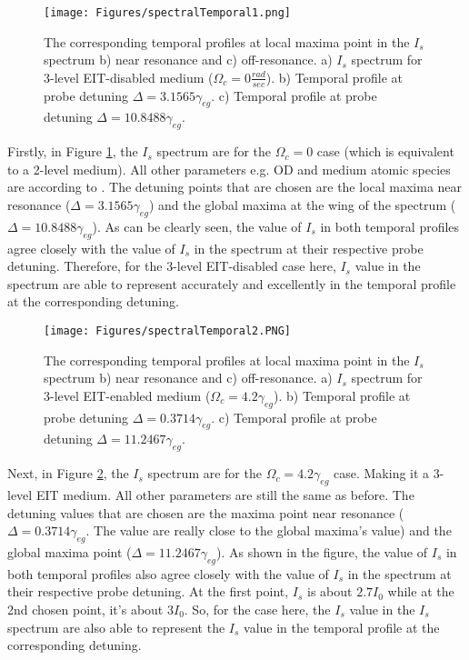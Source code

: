 \begin{figure}[h!]
    \centering
    \texttt{[image: Figures/spectralTemporal1.png]}
    \caption{The corresponding temporal profiles at local maxima point in the $I_{s}$ spectrum b) near resonance and c) off-resonance. a) $I_{s}$ spectrum for 3-level EIT-disabled medium ($\Omega_{c} = 0 \frac{rad}{sec}$). b)  Temporal profile at probe detuning $\Delta = 3.1565\gamma_{eg}$. c) Temporal profile at probe detuning $\Delta = 10.8488\gamma_{eg}$.}
    \label{fig: corresponding temporal profile 1}
\end{figure}

Firstly, in Figure \ref{fig: corresponding temporal profile 1}, the $I_{s}$ spectrum are for the $\Omega_{c} = 0$ case (which is equivalent to a 2-level medium). All other parameters e.g. OD and medium atomic species are according to \cite{jeong2010slow}. The detuning points that are chosen are the local maxima near resonance ($\Delta = 3.1565\gamma_{eg}$) and the global maxima at the wing of the spectrum ($\Delta = 10.8488\gamma_{eg}$). As can be clearly seen, the value of $I_{s}$ in both temporal profiles agree closely with the value of $I_{s}$ in the spectrum at their respective probe detuning. Therefore, for the 3-level EIT-disabled case here, $I_{s}$ value in the spectrum are able to represent accurately and excellently in the temporal profile at the corresponding detuning.

\newpage

\begin{figure}[h!]
    \centering
     \texttt{[image: Figures/spectralTemporal2.PNG]}
    \caption{The corresponding temporal profiles at local maxima point in the $I_{s}$ spectrum b) near resonance and c) off-resonance. a) $I_{s}$ spectrum for 3-level EIT-enabled medium ($\Omega_{c} = 4.2\gamma_{eg}$). b) Temporal profile at probe detuning $\Delta = 0.3714\gamma_{eg}$. c) Temporal profile at probe detuning $\Delta = 11.2467\gamma_{eg}$.}
    \label{fig: corresponding temporal profile 2}
\end{figure}

Next, in Figure \ref{fig: corresponding temporal profile 2}, the $I_{s}$ spectrum are for the $\Omega_{c} = 4.2\gamma_{eg}$ case. Making it a 3-level EIT medium. All other parameters are still the same as before. The detuning values that are chosen are the maxima point near resonance ($\Delta = 0.3714\gamma_{eg}$. The value are really close to the global maxima's value) and the global maxima point ($\Delta = 11.2467\gamma_{eg}$). As shown in the figure, the value of $I_{s}$ in both temporal profiles also agree closely with the value of $I_{s}$ in the spectrum at their respective probe detuning. At the first point, $I_{s}$ is about $2.7I_{0}$ while at the 2nd chosen point, it's about $3I_{0}$. So, for the case here, the $I_{s}$ value in the $I_{s}$ spectrum are also able to represent the $I_{s}$ value in the temporal profile at the corresponding detuning.

